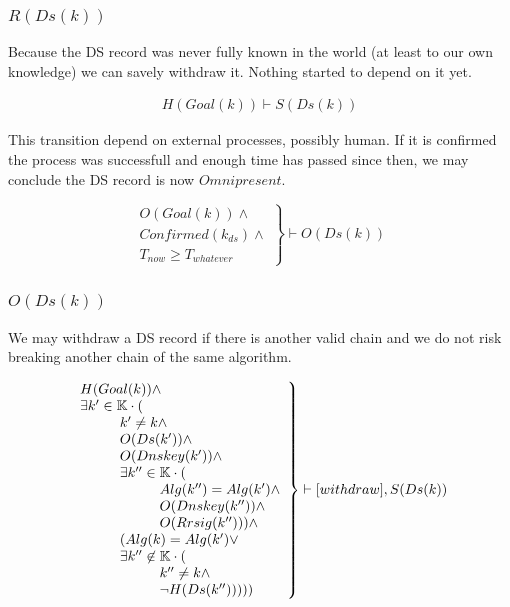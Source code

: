 \documentclass[twoside,english, a4paper]{article}
\newcommand{\mathbox}[1]{#1}
\begin{document}
\subsubsection{$R(Ds(k))$}

\mathbox{
	
	Because the DS record was never fully known in the world (at 
	least to our own knowledge) we can savely withdraw it. Nothing 
	started to depend on it yet.
	
	\begin{equation}
		\begin{split}
			H(Goal(k)) \vdash S(Ds(k))
		\end{split}
	\end{equation}

	This transition depend on external processes, possibly human. If it 
	is confirmed the process was successfull and enough time has passed
	since then, we may conclude the DS record is now $Omnipresent$.
	
	\begin{equation}
		\left.
		\begin{array}{l}
			O(Goal(k)) \wedge \\
			Confirmed(k_{ds}) \wedge \\
			T_{now} \geq T_{whatever}
		\end{array}
		\right\}\vdash O(Ds(k))
	\end{equation}
}

\subsubsection{$O(Ds(k))$}

\mathbox{

	We may withdraw a DS record if there is another valid chain and
	we do not risk breaking another chain of the same algorithm.

	\begin{equation}
		\left.
		\begin{array}{l}
\hskip 0cm			H(Goal(k)) \wedge \\
\hskip 0cm			\exists k' \in \mathbb{K} \cdot (\\
\hskip 1cm				k' \not = k \wedge \\
\hskip 1cm				O(Ds(k')) \wedge \\
\hskip 1cm				O(Dnskey(k')) \wedge \\
\hskip 1cm				\exists k'' \in \mathbb{K} \cdot ( \\
\hskip 2cm					Alg(k'') = Alg(k') \wedge \\
\hskip 2cm					O(Dnskey(k'')) \wedge \\
\hskip 2cm					O(Rrsig(k''))) \wedge \\
\hskip 1cm 				(Alg(k)=Alg(k') \vee \\
\hskip 1cm				\exists k'' \not \in \mathbb{K} \cdot (\\
\hskip 2cm					k'' \not = k \wedge\\
\hskip 2cm					\neg H(Ds(k'')) )))\\
		\end{array}
		\right\} \vdash [withdraw], S(Ds(k)) \\
	\end{equation}
}
\end{document}
